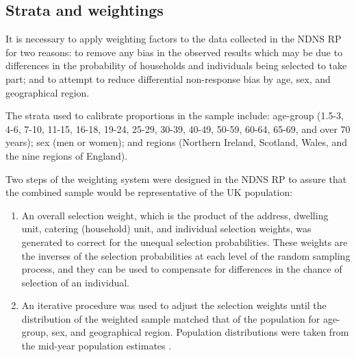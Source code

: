 \subsection{Strata and weightings}\vspace{-0.3cm}

It is necessary to apply weighting factors to the data collected in the NDNS RP for two reasons: to remove any bias in the observed results which may be due to differences in the probability of households and individuals being selected to take part; and to attempt to reduce differential non-response bias by age, sex, and geographical region. 

The strata used to calibrate proportions in the sample include: age-group (1.5-3, 4-6, 7-10, 11-15, 16-18, 19-24, 25-29, 30-39, 40-49, 50-59, 60-64, 65-69, and over 70 years); sex (men or women); and regions (Northern Ireland, Scotland, Wales, and the nine regions of England). 

Two steps of the weighting system were designed in the NDNS RP to assure that the combined sample would be representative of the UK population: 

\begin{enumerate}
	\item An overall selection weight, which is the product of the address, dwelling unit, catering (household) unit, and individual selection weights, was generated to correct for the unequal selection probabilities. These weights are the inverses of the selection probabilities at each level of the random sampling process, and they can be used to compensate for differences in the chance of selection of an individual.
	\item An iterative procedure was used to adjust the selection weights until the distribution of the weighted sample matched that of the population for age-group, sex, and geographical region. Population distributions were taken from the mid-year population estimates \parencite{OfficeofNationalStat}. 
\end{enumerate}


